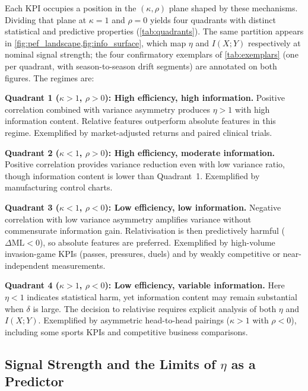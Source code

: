 Each KPI occupies a position in the $(\kappa,\rho)$ plane shaped by these mechanisms. Dividing that plane at $\kappa=1$ and $\rho=0$ yields four quadrants with distinct statistical and predictive properties (\cref{tab:quadrants}). The same partition appears in \cref{fig:pef_landscape,fig:info_surface}, which map $\eta$ and $I(X;Y)$ respectively at nominal signal strength; the four confirmatory exemplars of \cref{tab:exemplars} (one per quadrant, with season-to-season drift segments) are annotated on both figures. The regimes are:

\textbf{Quadrant 1 ($\kappa>1$, $\rho>0$): High efficiency, high information.} Positive correlation combined with variance asymmetry produces $\eta>1$ with high information content. Relative features outperform absolute features in this regime. Exemplified by market-adjusted returns and paired clinical trials.

\textbf{Quadrant 2 ($\kappa<1$, $\rho>0$): High efficiency, moderate information.} Positive correlation provides variance reduction even with low variance ratio, though information content is lower than Quadrant~1. Exemplified by manufacturing control charts.

\textbf{Quadrant 3 ($\kappa<1$, $\rho<0$): Low efficiency, low information.} Negative correlation with low variance asymmetry amplifies variance without commensurate information gain. Relativisation is then predictively harmful ($\Delta\mathrm{ML}<0$), so absolute features are preferred. Exemplified by high-volume invasion-game KPIs (passes, pressures, duels) and by weakly competitive or near-independent measurements.

\textbf{Quadrant 4 ($\kappa>1$, $\rho<0$): Low efficiency, variable information.} Here $\eta<1$ indicates statistical harm, yet information content may remain substantial when $\delta$ is large. The decision to relativise requires explicit analysis of both $\eta$ and $I(X;Y)$. Exemplified by asymmetric head-to-head pairings ($\kappa>1$ with $\rho<0$), including some sports KPIs and competitive business comparisons.

\subsection{Signal Strength and the Limits of \texorpdfstring{$\eta$}{eta} as a Predictor}
\label{sec:signal_strength}


